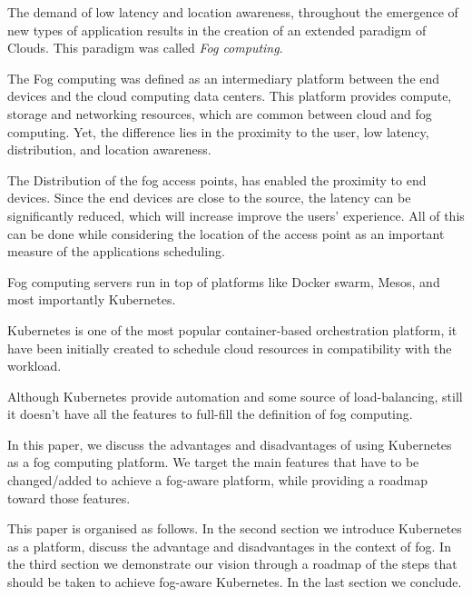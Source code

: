 \documentclass[letterpaper,twocolumn,10pt]{article}
\begin{document}
The demand of low latency and location awareness, throughout the emergence of new types of application results in the creation of an extended paradigm of     Clouds. This paradigm was called {\em Fog computing}\cite{bonomi2011connected,Bonomi:2012:FCR:2342509.2342513}.

The Fog computing was defined as an intermediary platform between the end devices and the cloud computing data centers. This platform provides compute, storage and networking resources, which are common between cloud and fog computing. Yet, the difference lies in the proximity to the user, low latency, distribution, and location awareness. 

The Distribution of the fog access points, has enabled the proximity to end devices. Since the end devices are close to the source, the latency can be significantly reduced, which will increase improve the users' experience. All of this can be done while considering the location of the access point as an important measure of the applications scheduling.

Fog computing servers run in top of platforms like Docker swarm, Mesos, and most importantly Kubernetes.

Kubernetes is one of the most popular container-based orchestration  platform, it have been initially created to schedule cloud resources in compatibility with the workload.

Although Kubernetes provide automation and some source of load-balancing, still it doesn't have all the features to full-fill the definition  of fog computing.    

In this paper, we discuss the advantages and disadvantages of using Kubernetes as a fog computing platform. We target the main features that have to be changed/added to achieve a fog-aware platform, while providing a roadmap toward those features.


This paper is organised as follows. In the second section we introduce Kubernetes as a platform, discuss the advantage and disadvantages in the context of fog. In the third section we demonstrate our vision through a roadmap of the steps that should be taken to achieve fog-aware Kubernetes. In the last section we conclude. 
\end{document}
